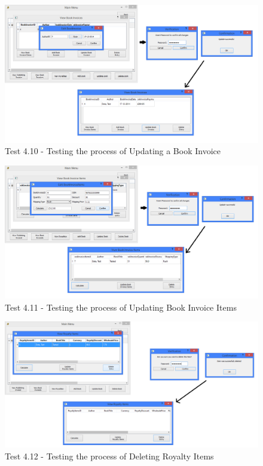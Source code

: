 \begin{landscape}
\begin{figure}[H]
    \includegraphics[width=\textwidth]{./Testing/Evidence/Series4/UpdateBookInvoiceTest.png}
    \caption{Test 4.10 - Testing the process of Updating a Book Invoice}  \label{fig:UpdateBookInvoiceTest}
\end{figure}

\begin{figure}[H]
    \includegraphics[width=\textwidth]{./Testing/Evidence/Series4/UpdateBookInvoiceItemsTest.png}
    \caption{Test 4.11 - Testing the process of Updating Book Invoice Items}  \label{fig:UpdateBookInvoiceItemsTest}
\end{figure}

\begin{figure}[H]
    \includegraphics[width=\textwidth]{./Testing/Evidence/Series4/DeleteRoyaltyItemsDataTest.png}
    \caption{Test 4.12 - Testing the process of Deleting Royalty Items}  \label{fig:DeleteRoyaltyItemsDataTest}
\end{figure}


\end{landscape}
